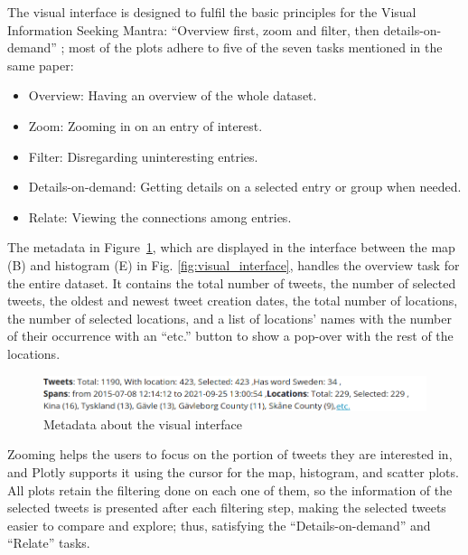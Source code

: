 The visual interface is designed to fulfil the basic principles for the Visual Information Seeking
Mantra: ``Overview first, zoom and filter, then details-on-demand'' \cite{shneidermanEyesHaveIt1996}; most of the plots
adhere to five of the seven tasks mentioned in the same paper:
\begin{itemize}
  \item Overview: Having an overview of the whole dataset.
  \item Zoom: Zooming in on an entry of interest.
  \item Filter: Disregarding uninteresting entries.
  \item Details-on-demand: Getting details on a selected entry or group when needed.
  \item Relate: Viewing the connections among entries.
\end{itemize}

The metadata in Figure~\ref{fig:meta_data}, which are displayed in the interface between the map (B)
and histogram (E) in Fig. \ref{fig:visual_interface}, handles the overview task for the entire
dataset. It contains the total number of tweets, the number of selected tweets, the oldest and
newest tweet creation dates, the total number of locations, the number of selected locations, and a
list of locations' names with the number of their occurrence with an ``etc.'' button to show a
pop-over with the rest of the locations.

\begin{figure}[H]
    \begin{center}
        \includegraphics[width=\columnwidth]{./images/meta_data.png}
    \end{center}
    \caption{Metadata about the visual interface}
    \label{fig:meta_data}
\end{figure}


Zooming helps the users to focus on the portion of tweets they are interested in, and Plotly
supports it using the cursor for the map, histogram, and scatter plots. All plots retain the
filtering done on each one of them, so the information of the selected tweets is presented after
each filtering step, making the selected tweets easier to compare and explore; thus, satisfying the
``Details-on-demand'' and ``Relate'' tasks.

